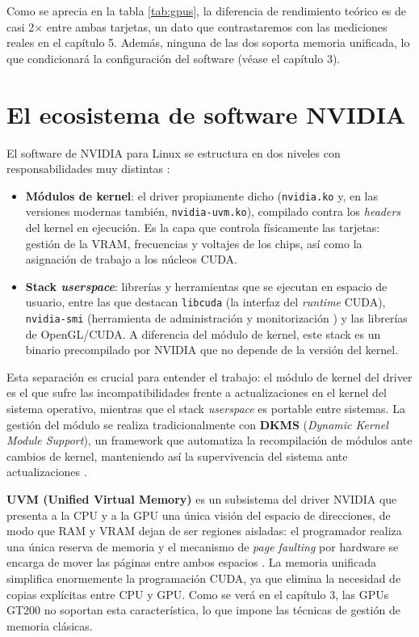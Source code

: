 Como se aprecia en la tabla \ref{tab:gpus}, la diferencia de rendimiento teórico es de casi 2$\times$ entre ambas tarjetas, un dato que contrastaremos con las mediciones reales en el capítulo 5. Además, ninguna de las dos soporta memoria unificada, lo que condicionará la configuración del software (véase el capítulo 3).

\section{El ecosistema de software NVIDIA}

El software de NVIDIA para Linux se estructura en dos niveles con responsabilidades muy distintas \cite{nvidia_driver_readme}:

\begin{itemize}
    \item \textbf{Módulos de kernel}: el driver propiamente dicho (\texttt{nvidia.ko} y, 
    en las versiones modernas también, \texttt{nvidia-uvm.ko}), compilado contra los \textit{headers} 
    del kernel en ejecución. Es la capa que controla físicamente las tarjetas: gestión de la VRAM,
    frecuencias y voltajes de los chips, así como la asignación de trabajo a los núcleos CUDA.

    \item \textbf{Stack \textit{userspace}}: librerías y herramientas que se ejecutan en espacio de usuario, entre las que destacan \texttt{libcuda} (la interfaz del \textit{runtime} CUDA), \texttt{nvidia-smi} (herramienta de administración y monitorización \cite{nvidia_smi}) y las librerías de OpenGL/CUDA. A diferencia del módulo de kernel, este stack es un binario precompilado por NVIDIA que no depende de la versión del kernel.
\end{itemize}

Esta separación es crucial para entender el trabajo: el módulo de kernel del driver es el que sufre 
las incompatibilidades frente a actualizaciones en el kernel del sistema operativo, mientras
que el stack \textit{userspace} es portable entre sistemas. La gestión del módulo se realiza tradicionalmente
con \textbf{DKMS} (\textit{Dynamic Kernel Module Support}), un framework que automatiza 
la recompilación de módulos ante cambios de kernel, manteniendo así la supervivencia del
sistema ante actualizaciones \cite{dkms}.

\textbf{UVM (Unified Virtual Memory)} es un subsistema del driver NVIDIA que presenta a
 la CPU y a la GPU una única visión del espacio de direcciones, de modo que RAM y VRAM 
 dejan de ser regiones aisladas: el programador realiza una única reserva de memoria y 
 el mecanismo de \textit{page faulting} por hardware se encarga de mover las páginas 
 entre ambos espacios \cite{nvidia_uvm_blog,nvidia_uvm_docs}. La memoria unificada simplifica 
 enormemente la programación CUDA, ya que elimina la necesidad de copias explícitas entre CPU y GPU.
Como se verá en el capítulo 3, las GPUs GT200 no soportan esta característica, lo que
impone las técnicas de gestión de memoria clásicas.

